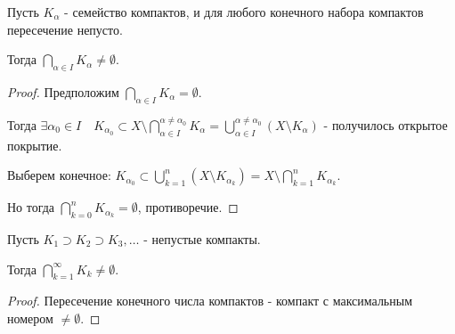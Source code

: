 
\begin{theorem} \thmslashn

    Пусть $K_{\alpha}$ - семейство компактов, и для любого конечного набора компактов пересечение непусто.

    Тогда $\bigcap\limits_{\alpha\in I} K_{\alpha} \neq \emptyset$.
    \begin{proof} \thmslashn
    
        Предположим $\bigcap\limits_{\alpha\in I} K_{\alpha} = \emptyset $.

        Тогда $\exists{\alpha_0\in I}\quad K_{\alpha_0} \subset X \setminus \bigcap\limits_{\alpha\in I}^{\alpha \neq \alpha_0} K_{\alpha} = \bigcup\limits_{\alpha\in I}^{\alpha \neq \alpha_0} (X \setminus K_{\alpha})$ - получилось открытое покрытие.

        Выберем конечное: $K_{\alpha_0} \subset \bigcup\limits_{k=1}^{n} (X \setminus K_{\alpha_{k}}) = X \setminus \bigcap\limits_{k=1}^{n} K_{\alpha_k}$.

        Но тогда $\bigcap\limits_{k=0}^{n} K_{\alpha_{k}} = \emptyset$, противоречие. \qedhere


    \end{proof}
\end{theorem}
\begin{consequence} \thmslashn

    Пусть $K_1 \supset K_2 \supset K_3, \ldots$ - непустые компакты.

    Тогда $\bigcap_{k=1}^{\infty} K_{k} \neq \emptyset $.

    \begin{proof} \thmslashn
    
        Пересечение конечного числа компактов - компакт с максимальным номером $\neq \emptyset$.
    \end{proof}
\end{consequence}
